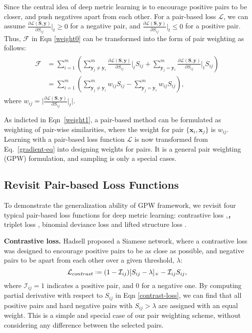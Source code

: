 \documentclass[10pt,twocolumn,letterpaper]{article}
\def\vx{{\bm{x}}}
\def\vy{{\bm{y}}}
\def\mS{{\bm{S}}}
\newcommand*{\defeq}{\mathrel{\vcenter{\baselineskip0.5ex \lineskiplimit0pt
			\hbox{\scriptsize.}\hbox{\scriptsize.}}}=}
\begin{document}
  Since the central idea of deep metric learning is to encourage positive pairs to be closer, and push negatives apart from each other. For a pair-based loss $\mathcal{L}$, we can assume $\frac{\partial\mathcal{L}(\mS, \vy)}{\partial S_{ij}} \big|_{t} \geqslant 0$ for a negative pair, and $\frac{\partial\mathcal{L}(\mS, \vy)}{\partial S_{ij}} \big|_{t} \leqslant 0$ for a positive pair. Thus, $\mathcal{F}$ in Eqn \ref{weight0} can be transformed into the form of pair weighting as follows:
\begin{align}
\begin{split}
\label{weight1}
\mathcal{F} &{}= \sum_{i=1}^{m}\left( \sum_{\vy_j \neq \vy_i}^{m}
\frac{\partial\mathcal{L}(\mS, \vy)}{\partial S_{ij}} \bigg|_{t}  S_{ij}
+ \sum_{\vy_j = \vy_i}^{m} \frac{\partial\mathcal{L}(\mS, \vy)}{\partial S_{ij}} \bigg|_{t}  S_{ij} \right) \\
&{}=  \sum_{i=1}^{m}
\left( \sum_{\vy_j \neq \vy_i}^{m} w_{ij}  S_{ij} - \sum_{\vy_j = \vy_i}^{m} w_{ij} S_{ij} \right),
\end{split}
\end{align}
where $w_{ij} = \bigg| \frac{\partial\mathcal{L}(\mS, \vy)}{\partial S_{ij}} \big|_{t}  \bigg|$.


As indicted in Eqn~\ref{weight1}, a pair-based method can be formulated as weighting of pair-wise similarities, where the weight for pair $\{\vx_i, \vx_j\}$ is $w_{ij}$.
Learning with a pair-based loss function $\mathcal{L}$ is now transformed from Eq.~\ref{gradient-eq} into designing weights for pairs. It is a general pair weighting (GPW) formulation, and sampling is only a special cases. 


\subsection{Revisit Pair-based Loss Functions}
\label{subsection-rethinking}
To demonstrate the generalization ability of GPW framework, we revisit four typical pair-based loss functions for deep metric learning: contrastive loss \cite{contrastive},， triplet loss \cite{Hoffer2015DeepML}, binomial deviance loss \cite{binomial} and lifted structure loss  \cite{lifted-structured-loss}. 

{\bf Contrastive loss.} Hadsell \etal \cite{contrastive} proposed a Siamese network, where a contrastive loss was designed to encourage positive pairs to be as close as possible, and negative pairs to be apart from each other over a given threshold, $\lambda$:
\begin{equation}
\label{contrast-loss}
\mathcal{L}_{contrast} \defeq (1-\mathcal{I}_{ij}) [S_{ij} - \lambda ]_+ - \mathcal{I}_{ij}S_{ij} ,
\end{equation}
where $ \mathcal{I}_{ij}=1$ indicates a positive pair, and $0$ for a negative one.
By computing partial derivative with respect to $S_{ij}$ in Eqn \ref{contrast-loss}, we can find that all positive pairs and hard negative pairs with $S_{ij} > \lambda $ are assigned with an equal weight. This is a simple and special case of our pair weighting scheme, without considering any difference between the selected pairs.
\end{document}
